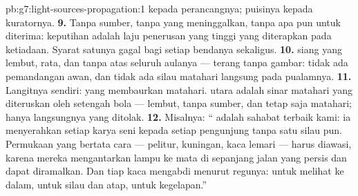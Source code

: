 \begin{solution}{pb:g7:light-sources-propagation:1}
kepada perancangnya; puisinya kepada kuratornya.
\textbf{9.} Tanpa sumber, tanpa  yang meninggalkan, tanpa apa
pun untuk diterima: keputihan adalah laju penerusan yang tinggi yang
diterapkan pada ketiadaan. Syarat satunya gagal bagi setiap bendanya
sekaligus.
\textbf{10.}  siang yang lembut, rata, dan tanpa 
atas seluruh aulanya --- terang tanpa gambar: tidak ada pemandangan
awan, dan tidak ada silau matahari langsung pada pualamnya.
\textbf{11.} Langitnya sendiri:  yang membaurkan  matahari.
 utara adalah sinar matahari yang diteruskan oleh setengah bola
 --- lembut, tanpa sumber, dan tetap saja matahari; hanya 
langsungnya yang ditolak.
\textbf{12.} Misalnya: `` adalah sahabat terbaik kami: ia
menyerahkan setiap karya seni kepada setiap pengunjung tanpa satu
silau pun. Permukaan yang bertata cara  --- pelitur, kuningan,
kaca lemari --- harus diawasi, karena mereka mengantarkan lampu ke
mata di sepanjang jalan yang persis dan dapat diramalkan. Dan tiap
kaca mengabdi menurut regunya:  untuk melihat ke dalam, 
untuk silau dan  atap,  untuk kegelapan.''
\end{solution}

